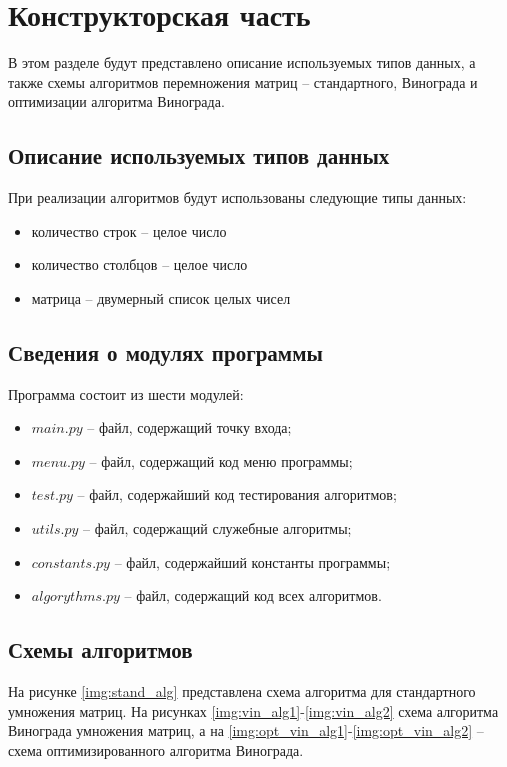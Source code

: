 \chapter{Конструкторская часть}
В этом разделе будут представлено описание используемых типов данных, а также схемы алгоритмов перемножения матриц -- стандартного, Винограда и оптимизации алгоритма Винограда.

\section{Описание используемых типов данных}

При реализации алгоритмов будут использованы следующие типы данных:

\begin{itemize}
	\item количество строк -- целое число
	\item количество столбцов -- целое число
	\item матрица -- двумерный список целых чисел
\end{itemize}


\section{Сведения о модулях программы}
Программа состоит из шести модулей:
\begin{itemize}
	\item $main.py$ -- файл, содержащий точку входа;
    \item $menu.py$ -- файл, содержащий код меню программы;
    \item $test.py$ -- файл, содержайший код тестирования алгоритмов;
    \item $utils.py$ -- файл, содержащий служебные алгоритмы;
    \item $constants.py$ -- файл, содержайший константы программы;
    \item $algorythms.py$ -- файл, содержащий код всех алгоритмов. \newline
\end{itemize}

\section{Схемы алгоритмов}
На рисунке \ref{img:stand_alg} представлена схема алгоритма для стандартного умножения матриц. На рисунках \ref{img:vin_alg1}-\ref{img:vin_alg2} схема алгоритма Винограда умножения матриц, а на \ref{img:opt_vin_alg1}-\ref{img:opt_vin_alg2} -- схема оптимизированного алгоритма Винограда.


